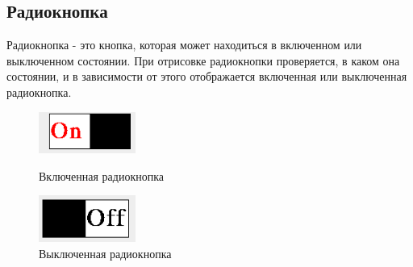 \documentclass[14pt]{extarticle}
\begin{document}
	\subsection*{Радиокнопка}
		Радиокнопка - это кнопка, которая может находиться в включенном или выключенном состоянии. При отрисовке радиокнопки проверяется, в каком она состоянии, и в зависимости от этого отображается включенная или выключенная радиокнопка.
		\begin{figure}[h]
		\begin{center}
		\begin{minipage}[h]{0.4\linewidth}
		\includegraphics[width=90pt]{pictures/toggleButton1.png}
		\caption{ Включенная радиокнопка} %
		\label{ris:b1} %
		\end{minipage}
		\hfill 
		\begin{minipage}[h]{0.4\linewidth}
		\includegraphics[width=90pt]{pictures/toggleButton2.png}
		\caption{Выключенная радиокнопка}
		\label{ris:b2}
		\end{minipage}
		\end{center}
		\end{figure}
		
\end{document}
